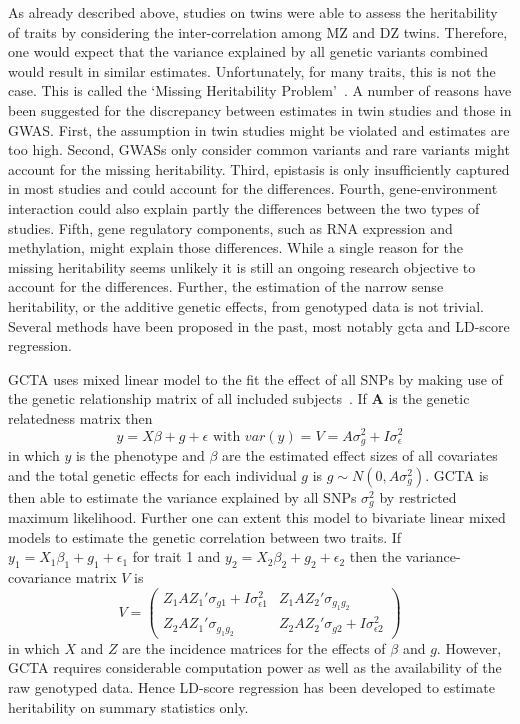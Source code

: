 As already described above, studies on twins were able to assess the heritability of traits by considering the inter-correlation among MZ and DZ twins.
Therefore, one would expect that the variance explained by all genetic variants combined would result in similar estimates.
Unfortunately, for many traits, this is not the case.
This is called the `Missing Heritability Problem'~\cite{Vineis2010}.
A number of reasons have been suggested for the discrepancy between estimates in twin studies and those in GWAS\@.
First, the assumption in twin studies might be violated and estimates are too high.
Second, GWASs only consider common variants and rare variants might account for the missing heritability.
Third, epistasis is only insufficiently captured in most studies and could account for the differences.
Fourth, gene-environment interaction could also explain partly the differences between the two types of studies.
Fifth, gene regulatory components, such as RNA expression and methylation, might explain those differences.
While a single reason for the missing heritability seems unlikely it is still an ongoing research objective to account for the differences.
Further, the estimation of the narrow sense heritability, or the additive genetic effects, from genotyped data is not trivial.
Several methods have been proposed in the past, most notably \acrfull{gcta} and LD-score regression.

GCTA uses mixed linear model to the fit the effect of all SNPs by making use of the genetic relationship matrix of all included subjects~\cite{Yang2011}.
If $\textbf{A}$ is the genetic relatedness matrix then
\begin{equation}
  y = X\beta + g + \epsilon \text{ with } var(y) = V = A\sigma^2_g + I\sigma^2_\epsilon
\end{equation}
in which $y$ is the phenotype and $\beta$ are the estimated effect sizes of all covariates and the total genetic effects for each individual $g$ is $g \sim N(0, A\sigma^2_g)$.
GCTA is then able to estimate the variance explained by all SNPs $\sigma^2_g$ by restricted maximum likelihood.
Further one can extent this model to bivariate linear mixed models to estimate the genetic correlation between two traits.
If $y_1 = X_1\beta_1 + g_1 + \epsilon_1$ for trait 1 and $y_2= X_2\beta_2 + g_2 + \epsilon_2$ then the variance-covariance matrix $V$ is
\begin{equation}
  V = 
  \begin{pmatrix}
    Z_1AZ_1'\sigma_{g1} + I\sigma^2_{\epsilon 1} & Z_1AZ_2'\sigma_{g_1g_2} \\
    Z_2AZ_1'\sigma_{g_1g_2} & Z_2AZ_2'\sigma_{g2} + I\sigma^2_{\epsilon 2}
  \end{pmatrix}
\end{equation}
in which $X$ and $Z$ are the incidence matrices for the effects of $\beta$ and $g$.
However, GCTA requires considerable computation power as well as the availability of the raw genotyped data.
Hence LD-score regression has been developed to estimate heritability on summary statistics only.

